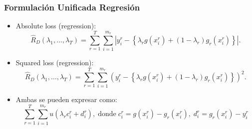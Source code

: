\documentclass{beamer}
\newcommand{\abs}[1]{\left|#1\right|}
\newcommand{\ntasks}{T}
\newcommand{\npertask}{m}
\newcommand{\sample}{D}
\newcommand{\risk}{R}
\newcommand{\emprisk}{\hat{\risk}_{\sample}}
\begin{document}
\begin{frame}
      \frametitle{Formulación Unificada Regresión}

      \begin{itemize}
            \item Absolute loss (regression):
            \begin{equation}
                \nonumber%
                \emprisk(\lambda_1, \ldots, \lambda_\ntasks) = \sum_{r=1}^\ntasks \sum_{i=1}^{\npertask_r} \abs{y_i^r - \left\lbrace\lambda_r g(x_i^r) + (1 - \lambda_r) g_r(x_i^r) \right \rbrace} .
            \end{equation}
            \item Squared loss (regression):
            \begin{equation}
                \nonumber%
                \emprisk(\lambda_1, \ldots, \lambda_\ntasks) = \sum_{r=1}^\ntasks \sum_{i=1}^{\npertask_r} \left( {y_i^r - \left\lbrace\lambda_r g(x_i^r) + (1 - \lambda_r) g_r(x_i^r) \right \rbrace} \right)^2 .
            \end{equation}
            \item Ambas se pueden expresar como:
            \begin{equation}
                  \nonumber
                  \sum_{r=1}^\ntasks \sum_{i=1}^{\npertask_r} u(\lambda_r c_i^r + d_i^r) ,\; \text{donde} \; c_i^r = g(x_i^r) - g_r(x_i^r)  , \;  d_i^r =  g_r(x_i^r) - y_i^r
              \end{equation}
        \end{itemize}

\end{frame}
\end{document}
